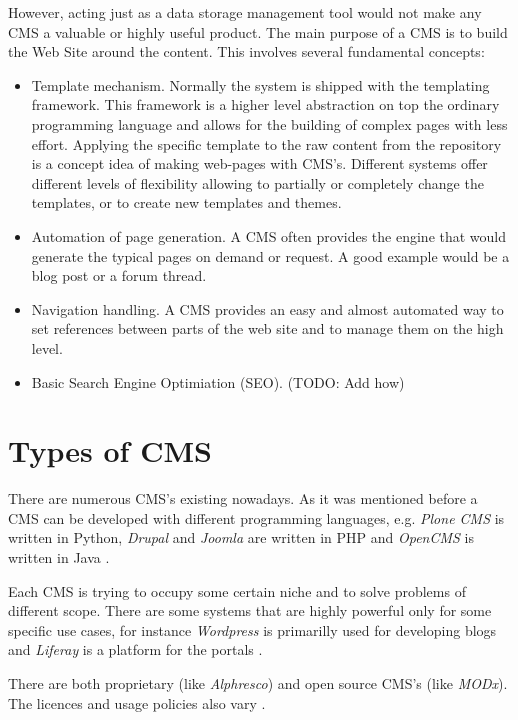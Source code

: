 However, acting just as a data storage management tool would not make any CMS a
valuable or highly useful product. The main purpose of a CMS is to build the Web
Site around the content. This involves several fundamental concepts:
\begin{itemize}
	\item Template mechanism. Normally the system is shipped with the  templating
	framework. This framework is a higher level abstraction on top the ordinary
	programming language and allows for the building of complex pages with less
	effort.
	Applying the specific template to the raw content from the repository is a
	concept idea of making web-pages with CMS's.
	Different systems offer different levels of flexibility allowing to partially or
	completely change the templates, or to create new templates and themes.

	\item Automation of page generation. A CMS often provides the engine that would
	generate the typical pages on demand or request. A good example would be a blog
	post or a forum thread.
	
    \item Navigation handling. A CMS provides an easy and almost automated way to
    set references between parts of the web site and to manage them on the high
    level.
	
	\item Basic Search Engine Optimiation (SEO). (TODO: Add how)
\end{itemize}


\section{Types of CMS} 
There are numerous CMS's existing nowadays. As it was mentioned
before a CMS can be developed with different programming languages, e.g.
\emph{Plone CMS} is written in Python, \emph{Drupal} and \emph{Joomla} are
written in PHP and \emph{OpenCMS} is written in Java \cite{cms_list}.

Each CMS is trying to occupy some certain niche and to solve problems of
different scope. There are some systems that are highly powerful only for some
specific use cases, for instance \emph{Wordpress} is primarilly used for developing
blogs \cite{wordpress} and \emph{Liferay} is a platform for the portals \cite{liferay}.

There are both proprietary (like \emph{Alphresco}) and open source CMS's (like \emph{MODx}).
The licences and usage policies also vary \cite{cms_list}.

